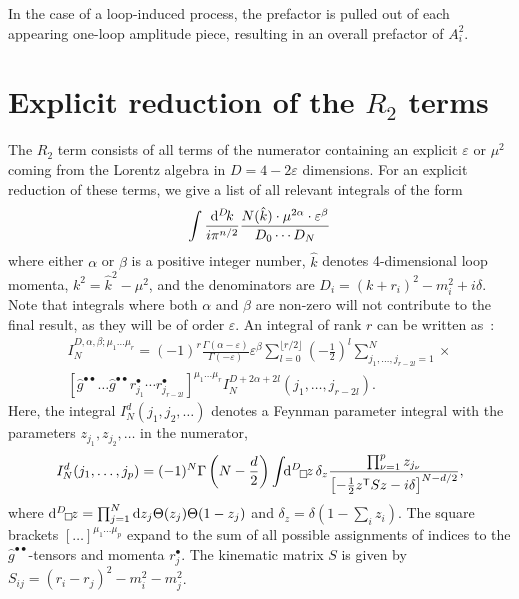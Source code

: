 In the case of a loop-induced process, the prefactor is pulled out of each appearing one-loop amplitude piece, resulting in an overall prefactor of $A_i^2$.

\chapter{Explicit reduction of the $R_2$ terms}
\label{app:r2}
The $R_2$ term \cite{Ossola:2008xq} consists of all terms of the numerator
containing an explicit $\varepsilon$ or $\mu^2$ coming from the Lorentz
algebra in $D=4-2\varepsilon$ dimensions. 
For an explicit reduction of these terms, we give a list of all relevant integrals of the form
\begin{align}
\int\frac{\diff[D] k}{i\pi^{n/2}}
\frac{N(\hat{k})\cdot\mu^{2\alpha}\cdot\varepsilon^\beta}{D_0\cdots D_N}
\end{align}
where either $\alpha$ or $\beta$ is a positive integer number, 
$\hat{k}$ denotes 4-dimensional loop momenta, $k^2=\hat{k}^2-\mu^2$, 
and the denominators are $D_i=(k+r_i)^2-m_i^2+i\delta$.
Note that integrals where both $\alpha$ and $\beta$ are
non-zero will not contribute to the final result, as they will be of order $\varepsilon$.
An integral of rank $r$ 
can be written as~\cite{Binoth:2005ff,Reiter:2009kb}:
\begin{multline}
I_N^{D,\alpha,\beta;\mu_1\ldots\mu_r}=
(-1)^{r}\frac{\Gamma(\alpha-\varepsilon)}{\Gamma(-\varepsilon)}
\varepsilon^\beta
\sum_{l=0}^{\lfloor r/2\rfloor}\left(-\frac12\right)^l
\sum_{j_1,\ldots,j_{r-2l}=1}^N
\times\\
\left[\hat{g}^{\bullet\bullet}\ldots
\hat{g}^{\bullet\bullet}r_{j_1}^\bullet
\cdots r_{j_{r-2l}}^\bullet\right]^{\mu_1\ldots\mu_r}
I_N^{D+2\alpha+2l}(j_1,\ldots,j_{r-2l}).
\end{multline}
Here, the integral $I_N^d(j_1,j_2,\ldots)$ denotes a Feynman parameter
integral with the parameters $z_{j_1}, z_{j_2}, \ldots$ in the numerator,
\begin{equation}
I_N^d(j_1,\ldots, j_p)=
(-1)^N\Gamma\left(N-\frac{d}2\right)%
\int\!\!\diff[D]_\Box\!z\,\delta_z
\frac{\prod_{\nu=1}^p z_{j_\nu}}{%
\left[-\frac12 z^{\mathsf{T}}Sz-i\delta\right]^{N-d/2}},
\end{equation}
where $\diff[D]_\Box\!z=
\prod_{j=1}^N\mathrm{d}z_j\Theta(z_j)\Theta(1-z_j)$
and $\delta_z=\delta(1-\sum_i z_i)$.
The square brackets $[\ldots]^{\mu_1\ldots\mu_p}$ expand to the sum of
all possible assignments of indices to the $\hat{g}^{\bullet\bullet}$-tensors
and momenta $r_j^\bullet$. 
The kinematic matrix $S$ is given by $S_{ij}=(r_i-r_j)^2-m_i^2-m_j^2$.

